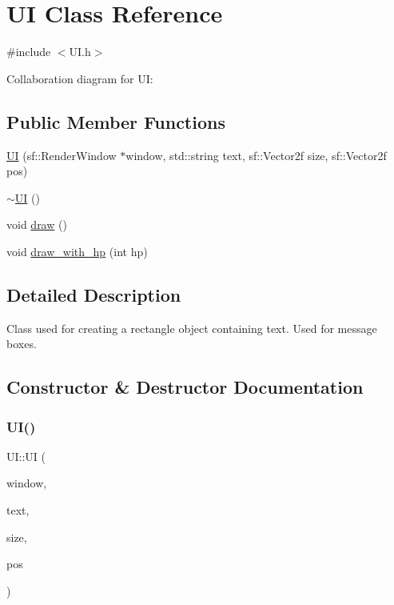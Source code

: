 \hypertarget{classUI}{}\section{UI Class Reference}
\label{classUI}


{\ttfamily \#include $<$U\+I.\+h$>$}



Collaboration diagram for UI\+:
\subsection*{Public Member Functions}
\begin{DoxyCompactItemize}
\item 
\hyperlink{classUI_ad9b5bbd16f590cc332411bae96a367fa}{UI} (sf\+::\+Render\+Window $\ast$window, std\+::string text, sf\+::\+Vector2f size, sf\+::\+Vector2f pos)
\item 
\hyperlink{classUI_a1b23d0c64c7cbb3d143d90ec532a7ccd}{$\sim$\+UI} ()
\item 
void \hyperlink{classUI_a11a5b60d8f59c41b6d1acf9d153eaafa}{draw} ()
\item 
void \hyperlink{classUI_a99c8d122817b176f2dcec5589d64c008}{draw\+\_\+with\+\_\+hp} (int hp)
\end{DoxyCompactItemize}


\subsection{Detailed Description}
Class used for creating a rectangle object containing text. Used for message boxes. 

\subsection{Constructor \& Destructor Documentation}
\mbox{\label{classUI_ad9b5bbd16f590cc332411bae96a367fa}} 
\subsubsection{\texorpdfstring{U\+I()}{UI()}}
{\footnotesize\ttfamily U\+I\+::\+UI (\begin{DoxyParamCaption}\item[{sf\+::\+Render\+Window $\ast$}]{window,  }\item[{std\+::string}]{text,  }\item[{sf\+::\+Vector2f}]{size,  }\item[{sf\+::\+Vector2f}]{pos }\end{DoxyParamCaption})}

